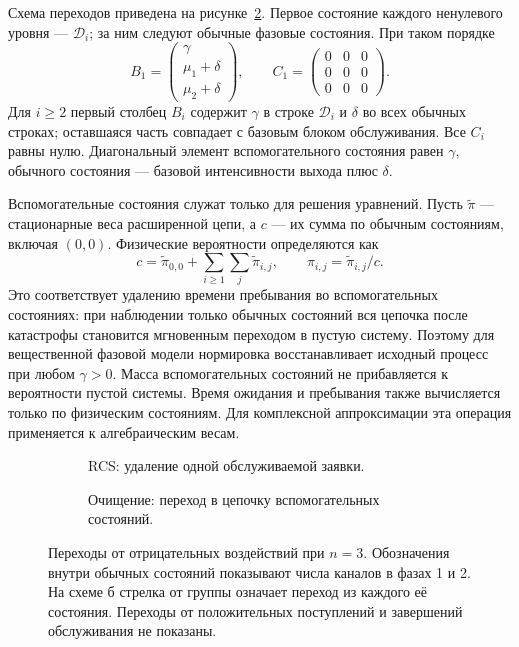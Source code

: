 Схема переходов приведена на рисунке~\ref{fig:disaster_transitions}. Первое состояние каждого ненулевого уровня --- \(\mathcal{D}_i\); за ним следуют обычные фазовые состояния. При таком порядке
\[
B_1=\begin{pmatrix}\gamma\\\mu_1+\delta\\\mu_2+\delta\end{pmatrix},\qquad
C_1=\begin{pmatrix}0&0&0\\0&0&0\\0&0&0\end{pmatrix}.
\]
Для \(i\ge2\) первый столбец \(B_i\) содержит \(\gamma\) в строке \(\mathcal{D}_i\) и \(\delta\) во всех обычных строках; оставшаяся часть совпадает с базовым блоком обслуживания. Все \(C_i\) равны нулю. Диагональный элемент вспомогательного состояния равен \(\gamma\), обычного состояния --- базовой интенсивности выхода плюс \(\delta\).

Вспомогательные состояния служат только для решения уравнений. Пусть \(\widetilde\pi\) --- стационарные веса расширенной цепи, а \(c\) --- их сумма по обычным состояниям, включая \((0,0)\). Физические вероятности определяются как
\[
c=\widetilde\pi_{0,0}+\sum_{i\ge1}\sum_j\widetilde\pi_{i,j},\qquad
\pi_{i,j}=\widetilde\pi_{i,j}/c.
\]
Это соответствует удалению времени пребывания во вспомогательных состояниях: при наблюдении только обычных состояний вся цепочка после катастрофы становится мгновенным переходом в пустую систему. Поэтому для вещественной фазовой модели нормировка восстанавливает исходный процесс при любом \(\gamma>0\). Масса вспомогательных состояний не прибавляется к вероятности пустой системы. Время ожидания и пребывания также вычисляется только по физическим состояниям. Для комплексной аппроксимации эта операция применяется к алгебраическим весам.

\begin{figure}[!htbp]
\centering
\begin{subfigure}[t]{0.98\linewidth}
\centering
{}
\caption{RCS: удаление одной обслуживаемой заявки.}
\label{fig:rcs_transitions}
\end{subfigure}

\begin{subfigure}[t]{0.98\linewidth}
\centering
{}
\caption{Очищение: переход в цепочку вспомогательных состояний.}
\label{fig:disaster_transitions}
\end{subfigure}
\caption{Переходы от отрицательных воздействий при \(n=3\). Обозначения внутри обычных состояний показывают числа каналов в фазах 1 и 2. На схеме б стрелка от группы означает переход из каждого её состояния. Переходы от положительных поступлений и завершений обслуживания не показаны.}
\label{fig:negative_transitions}
\end{figure}

